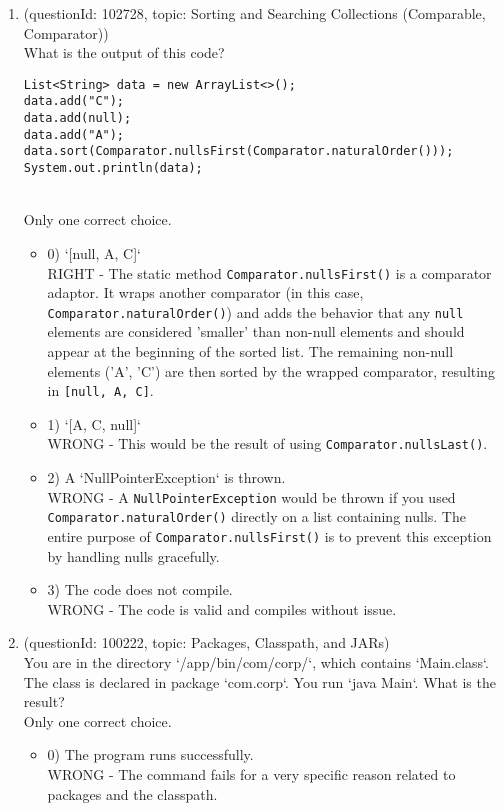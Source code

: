 \documentclass[12pt]{article}
\begin{document}
\begin{enumerate}[label=(\arabic*)]
\begin{itemize}
\end{itemize}
\item (questionId: 102728, topic: Sorting and Searching Collections (Comparable, Comparator)) \\ 
What is the output of this code?
\begin{verbatim}
List<String> data = new ArrayList<>();
data.add("C");
data.add(null);
data.add("A");
data.sort(Comparator.nullsFirst(Comparator.naturalOrder()));
System.out.println(data);
\end{verbatim}
\\ \noindent Only one correct choice. 
\begin{itemize}
\item 0) `[null, A, C]`
 \\ 
RIGHT - The static method \verb|Comparator.nullsFirst()| is a comparator adaptor. It wraps another comparator (in this case, \verb|Comparator.naturalOrder()|) and adds the behavior that any \verb|null| elements are considered 'smaller' than non-null elements and should appear at the beginning of the sorted list. The remaining non-null elements ('A', 'C') are then sorted by the wrapped comparator, resulting in \verb|[null, A, C]|.

\item 1) `[A, C, null]`
 \\ 
WRONG - This would be the result of using \verb|Comparator.nullsLast()|.

\item 2) A `NullPointerException` is thrown.
 \\ 
WRONG - A \verb|NullPointerException| would be thrown if you used \verb|Comparator.naturalOrder()| directly on a list containing nulls. The entire purpose of \verb|Comparator.nullsFirst()| is to prevent this exception by handling nulls gracefully.

\item 3) The code does not compile.
 \\ 
WRONG - The code is valid and compiles without issue.

\end{itemize}
\item (questionId: 100222, topic: Packages, Classpath, and JARs) \\ 
You are in the directory `/app/bin/com/corp/`, which contains `Main.class`. The class is declared in package `com.corp`. You run `java Main`. What is the result?
\\ \noindent Only one correct choice. 
\begin{itemize}
\item 0) The program runs successfully.
 \\ 
WRONG - The command fails for a very specific reason related to packages and the classpath.


\end{itemize}
\end{enumerate}
\end{document}
